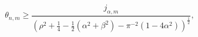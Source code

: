 \[\theta_{n,m}\geq\frac{j_{\alpha,m}}{\left(\rho^{2}+\tfrac{1}{4}-\tfrac{1}{2}(%
\alpha^{2}+\beta^{2})-\pi^{-2}(1-4\alpha^{2})\right)^{\frac{1}{2}}},\]